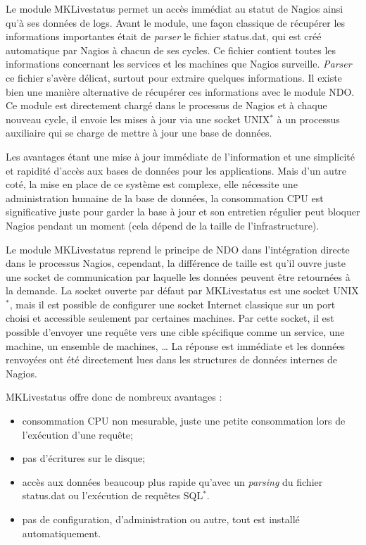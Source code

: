 Le module MKLivestatus permet un acc\`es imm\'ediat au statut de Nagios ainsi qu'\`a ses donn\'ees de logs.
Avant le module, une fa\c{c}on classique de r\'ecup\'erer les informations importantes \'etait de \textit{parser} le fichier \textsf{status.dat}, qui est cr\'e\'e automatique par Nagios \`a chacun de ses cycles.
Ce fichier contient toutes les informations concernant les services et les machines que Nagios surveille.
\textit{Parser} ce fichier s'av\`ere d\'elicat, surtout pour extraire quelques informations.
Il existe bien une mani\`ere alternative de r\'ecup\'erer ces informations avec le module NDO.
Ce module est directement charg\'e dans le processus de Nagios et \`a chaque nouveau cycle, il envoie les mises \`a jour via une socket UNIX$^*$ \`a un processus auxiliaire qui se charge de mettre \`a jour une base de donn\'ees.

Les avantages \'etant une mise \`a jour imm\'ediate de l'information et une simplicit\'e et rapidit\'e d'acc\`es aux bases de donn\'ees pour les applications.
Mais d'un autre cot\'e, la mise en place de ce syst\`eme est complexe, elle n\'ecessite une administration humaine de la base de donn\'ees, la consommation CPU est significative juste pour garder la base \`a jour et son entretien r\'egulier peut bloquer Nagios pendant un moment (cela d\'epend de la taille de l'infrastructure).

Le module MKLivestatus reprend le principe de NDO dans l'int\'egration directe dans le processus Nagios, cependant, la diff\'erence de taille est qu'il ouvre juste une socket de communication par laquelle les donn\'ees peuvent \^etre retourn\'ees \`a la demande.
La socket ouverte par d\'efaut par MKLivestatus est une socket UNIX$^*$, mais il est possible de configurer une socket Internet classique sur un port choisi et accessible seulement par certaines machines.
Par cette socket, il est possible d'envoyer une requ\^ete vers une cible sp\'ecifique comme un service, une machine, un ensemble de machines, \ldots{}
La r\'eponse est imm\'ediate et les donn\'ees renvoy\'ees ont \'et\'e directement lues dans les structures de donn\'ees internes de Nagios.

\noindent MKLivestatus offre donc de nombreux avantages :

\begin{itemize}
	\item consommation CPU non mesurable, juste une petite consommation lors de l'ex\'ecution d'une requ\^ete;
	\item pas d'\'ecritures sur le disque;
	\item acc\`es aux donn\'ees beaucoup plus rapide qu'avec un \textit{parsing} du fichier \textsf{status.dat} ou l'ex\'ecution de requ\^etes SQL$^*$.
	\item pas de configuration, d'administration ou autre, tout est install\'e automatiquement.

\end{itemize}

